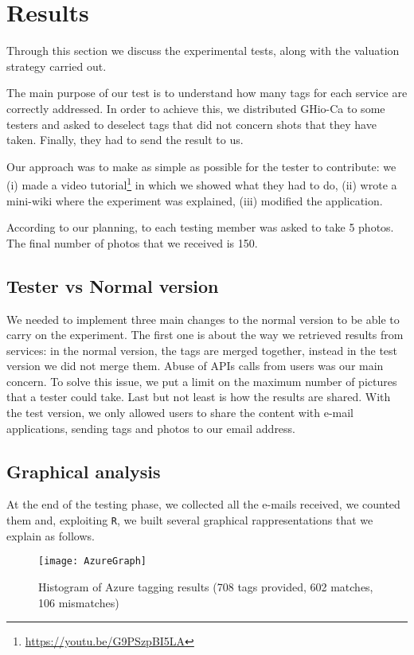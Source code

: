 \section{Results}
\label{sec:results}

Through this section we discuss the experimental tests, along with the valuation 
strategy carried out. 

The main purpose of our test is to understand how many tags for each service are 
correctly addressed. In order to achieve this, we distributed GHio-Ca to some 
testers and asked to deselect tags that did not concern shots that they have 
taken. Finally, they had to send the result to us.

Our approach was to make as simple as possible for the tester to contribute: we 
(i) made a video tutorial\footnote{\url{https://youtu.be/G9PSzpBI5LA}} in which 
we showed what they had to do, (ii) wrote a mini-wiki where the experiment was 
explained, (iii) modified the application. 

According to our planning, to each testing member was asked to take 5 photos. 
The final number of photos that we received is 150.

\subsection{Tester vs Normal version}

We needed to implement three main changes to the normal version to be able to 
carry on the experiment. The first one is about the way we retrieved results 
from services: in the normal version, the tags are merged together, instead in 
the test version we did not merge them.
Abuse of APIs calls from users was our main concern. To solve this issue, we put 
a limit on the maximum number of pictures that a tester could take.
Last but not least is how the results are shared. With the test version, we only 
allowed users to share the content with e-mail applications, sending tags and 
photos to our email address.


\subsection{Graphical analysis}

At the end of the testing phase, we collected all the e-mails received, we 
counted them and, exploiting \texttt{R}, we built several graphical 
rappresentations that we explain as follows.

\begin{figure}[H]
\centering
\texttt{[image: AzureGraph]}
\caption{Histogram of Azure tagging results (708 tags provided, 602 matches, 
106 mismatches)}
\label{img:testgraphsazure}
\end{figure}


